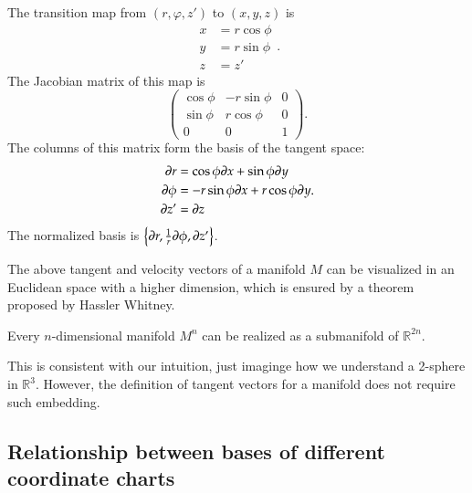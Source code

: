 \documentclass[11pt, a4paper]{book}
\begin{document}
\begin{Example}
  \label{exam:cylindrical-coordinate-basis}
  The transition map from $(r,\varphi,z')$ to $(x,y,z)$ is
  \begin{equation}
    \label{eq:cylindrical-coordinate-transform}
    \begin{aligned}
      x &= r \cos\phi \\
      y &= r \sin\phi \\
      z &= z'
    \end{aligned}.
  \end{equation}
  The Jacobian matrix of this map is
  \begin{equation}
    \label{eq:cylindrical-coordinate-jacobian-matrix}
    \begin{pmatrix}
      \cos\phi & -r\sin\phi & 0 \\
      \sin\phi & r\cos\phi & 0 \\
      0 & 0 & 1
    \end{pmatrix}.
  \end{equation}
  The columns of this matrix form the basis of the tangent space:
  \begin{equation}
    \begin{aligned}
      \boldsymbol{\partial}r &= \cos\phi \boldsymbol{\partial}x + \sin\phi \boldsymbol{\partial}y \\
      \boldsymbol{\partial}\phi &= -r \sin\phi \boldsymbol{\partial}x + r \cos\phi \boldsymbol{\partial}y \\
      \boldsymbol{\partial}z' &= \boldsymbol{\partial}z
    \end{aligned}.
  \end{equation}
  The normalized basis is
  $\left\{ \boldsymbol{\partial}r, \frac{1}{r}\boldsymbol{\partial}\phi, \boldsymbol{\partial}z' \right\}$.
\end{Example}

The above tangent and velocity vectors of a manifold $M$ can be visualized in an Euclidean
space with a higher dimension, which is ensured by a theorem proposed by Hassler Whitney.
\begin{Theorem}
  Every $n$-dimensional manifold $M^n$ can be realized as a submanifold of $\mathbb{R}^{2n}$.
\end{Theorem}
This is consistent with our intuition, just imaginge how we understand a 2-sphere in
$\mathbb{R}^3$. However, the definition of tangent vectors for a manifold does not require
such embedding.

\subsection{Relationship between bases of different coordinate charts}
\end{document}
